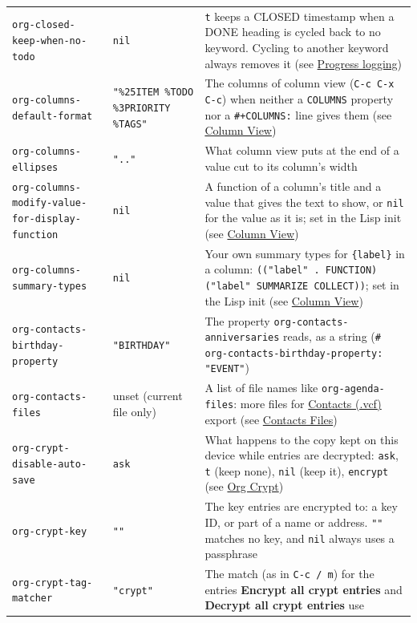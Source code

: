 \documentclass[11pt]{article}
\begin{document}
\begin{center}
\begin{tabular}{lll}
\texttt{org-closed-keep-when-no-todo} & \texttt{nil} & \texttt{t} keeps a CLOSED timestamp when a DONE heading is cycled back to no keyword. Cycling to another keyword always removes it (see \hyperref[sec:orgfbb8a58]{Progress logging})\\[0pt]
\texttt{org-columns-default-format} & \texttt{"\%25ITEM \%TODO \%3PRIORITY \%TAGS"} & The columns of column view (\texttt{C-c C-x C-c}) when neither a \texttt{COLUMNS} property nor a \texttt{\#+COLUMNS:} line gives them (see \hyperref[sec:orgc54f9dd]{Column View})\\[0pt]
\texttt{org-columns-ellipses} & \texttt{".."} & What column view puts at the end of a value cut to its column's width\\[0pt]
\texttt{org-columns-modify-value-for-display-function} & \texttt{nil} & A function of a column's title and a value that gives the text to show, or \texttt{nil} for the value as it is; set in the Lisp init (see \hyperref[sec:orgc54f9dd]{Column View})\\[0pt]
\texttt{org-columns-summary-types} & \texttt{nil} & Your own summary types for \texttt{\{label\}} in a column: \texttt{(("label" . FUNCTION) ("label" SUMMARIZE COLLECT))}; set in the Lisp init (see \hyperref[sec:orgc54f9dd]{Column View})\\[0pt]
\texttt{org-contacts-birthday-property} & \texttt{"BIRTHDAY"} & The property \texttt{org-contacts-anniversaries} reads, as a string (\texttt{\# org-contacts-birthday-property: "EVENT"})\\[0pt]
\texttt{org-contacts-files} & unset (current file only) & A list of file names like \texttt{org-agenda-files}: more files for \hyperref[sec:org9a53e51]{Contacts (.vcf)} export (see \hyperref[sec:orgba3cd98]{Contacts Files})\\[0pt]
\texttt{org-crypt-disable-auto-save} & \texttt{ask} & What happens to the copy kept on this device while entries are decrypted: \texttt{ask}, \texttt{t} (keep none), \texttt{nil} (keep it), \texttt{encrypt} (see \hyperref[sec:orgf01cffd]{Org Crypt})\\[0pt]
\texttt{org-crypt-key} & \texttt{""} & The key entries are encrypted to: a key ID, or part of a name or address. \texttt{""} matches no key, and \texttt{nil} always uses a passphrase\\[0pt]
\texttt{org-crypt-tag-matcher} & \texttt{"crypt"} & The match (as in \texttt{C-c / m}) for the entries \textbf{Encrypt all crypt entries} and \textbf{Decrypt all crypt entries} use\\[0pt]

\end{tabular}
\end{center}
\end{document}
